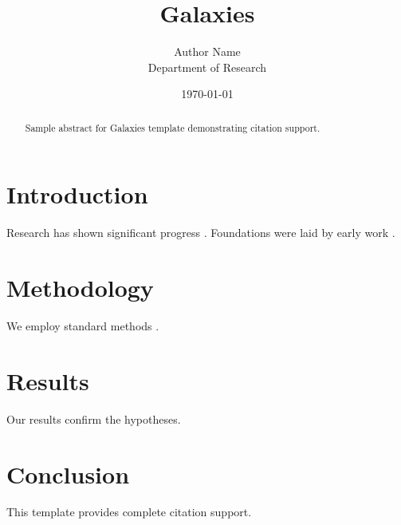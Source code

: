 \documentclass{mdpi}
\title{Galaxies}
\author{Author Name \\ \small Department of Research}
\date{\today}
\begin{document}
\maketitle

\begin{abstract}
Sample abstract for Galaxies template demonstrating citation support.
\end{abstract}

\section{Introduction}
Research has shown significant progress \citep{einstein1905}. Foundations were laid by early work \citep{turing1950}.

\section{Methodology}
We employ standard methods \citep{knuth1984}.

\section{Results}
Our results confirm the hypotheses.

\section{Conclusion}
This template provides complete citation support.



\end{document}
